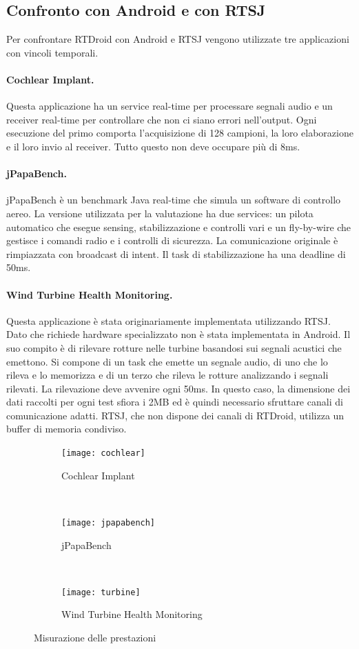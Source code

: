 \subsection{Confronto con Android e con RTSJ}
Per confrontare RTDroid con Android e RTSJ vengono utilizzate tre applicazioni con vincoli temporali.
\paragraph{Cochlear Implant.}
Questa applicazione ha un service real-time per processare segnali audio e un receiver real-time per controllare che non ci siano errori nell'output. Ogni esecuzione del primo comporta l'acquisizione di 128 campioni, la loro elaborazione e il loro invio al receiver. Tutto questo non deve occupare più di 8ms. 

\paragraph{jPapaBench.} jPapaBench è un benchmark Java real-time che simula un software di controllo aereo. La versione utilizzata per la valutazione ha due services: un pilota automatico che esegue sensing, stabilizzazione e controlli vari e un fly-by-wire che gestisce i comandi radio e i controlli di sicurezza. La comunicazione originale è rimpiazzata con broadcast di intent. Il task di stabilizzazione ha una deadline di 50ms.

\paragraph{Wind Turbine Health Monitoring.} Questa applicazione è stata originariamente implementata utilizzando RTSJ. Dato che richiede hardware specializzato non è stata implementata in Android. Il suo compito è di rilevare rotture nelle turbine basandosi sui segnali acustici che emettono. Si compone di un task che emette un segnale audio, di uno che lo rileva e lo memorizza e di un terzo che rileva le rotture analizzando i segnali rilevati. La rilevazione deve avvenire ogni 50ms. In questo caso, la dimensione dei dati raccolti per ogni test sfiora i 2MB ed è quindi necessario sfruttare canali di comunicazione adatti. RTSJ, che non dispone dei canali di RTDroid, utilizza un buffer di memoria condiviso.

\begin{figure}[h]
	\centering
	\begin{subfigure}[b]{0.3\textwidth}
		\texttt{[image: cochlear]}
		\caption{Cochlear Implant}
		\label{fig:cochlear}
	\end{subfigure}
	~ 
	\begin{subfigure}[b]{0.3\textwidth}
		\texttt{[image: jpapabench]}
		\caption{jPapaBench}
		\label{fig:jpapabench}
	\end{subfigure}
	~
	\begin{subfigure}[b]{0.3\textwidth}
		\texttt{[image: turbine]}
		\caption{Wind Turbine Health Monitoring}
		\label{fig:turbine}
	\end{subfigure}
	\caption{Misurazione delle prestazioni}\label{fig:appperformance}
\end{figure}

